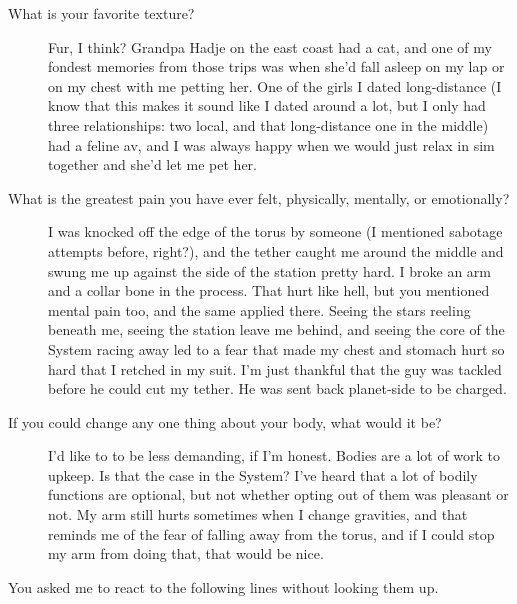\begin{description}
\item[What is your favorite texture?]
Fur, I think? Grandpa Hadje on the east coast had a cat, and one of my fondest memories from those trips was when she'd fall asleep on my lap or on my chest with me petting her. One of the girls I dated long-distance (I know that this makes it sound like I dated around a lot, but I only had three relationships: two local, and that long-distance one in the middle) had a feline av, and I was always happy when we would just relax in sim together and she'd let me pet her.
\item[What is the greatest pain you have ever felt, physically, mentally, or emotionally?]
I was knocked off the edge of the torus by someone (I mentioned sabotage attempts before, right?), and the tether caught me around the middle and swung me up against the side of the station pretty hard. I broke an arm and a collar bone in the process. That hurt like hell, but you mentioned mental pain too, and the same applied there. Seeing the stars reeling beneath me, seeing the station leave me behind, and seeing the core of the System racing away led to a fear that made my chest and stomach hurt so hard that I retched in my suit. I'm just thankful that the guy was tackled before he could cut my tether. He was sent back planet-side to be charged.
\item[If you could change any one thing about your body, what would it be?]
I'd like to to be less demanding, if I'm honest. Bodies are a lot of work to upkeep. Is that the case in the System? I've heard that a lot of bodily functions are optional, but not whether opting out of them was pleasant or not. My arm still hurts sometimes when I change gravities, and that reminds me of the fear of falling away from the torus, and if I could stop my arm from doing that, that would be nice.
\end{description}

You asked me to react to the following lines without looking them up.

